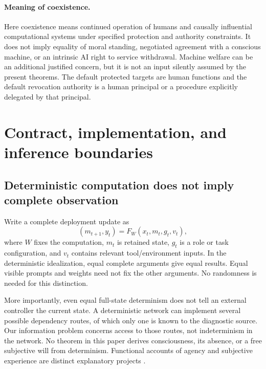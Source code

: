 \documentclass[11pt,a4paper]{article}
\theoremstyle{definition}\newtheorem{definition}{Definition}
\begin{document}
\paragraph{Meaning of coexistence.}
Here coexistence means continued operation of humans and causally influential computational systems under specified protection and authority constraints. It does not imply equality of moral standing, negotiated agreement with a conscious machine, or an intrinsic AI right to service withdrawal. Machine welfare can be an additional justified concern, but it is not an input silently assumed by the present theorems. The default protected targets are human functions and the default revocation authority is a human principal or a procedure explicitly delegated by that principal.

\section{Contract, implementation, and inference boundaries}
\label{sec:contract}
\subsection{Deterministic computation does not imply complete observation}
Write a complete deployment update as
\begin{equation}
(m_{t+1},y_t)=F_W(x_t,m_t,g_t,v_t),
\end{equation}
where $W$ fixes the computation, $m_t$ is retained state, $g_t$ is a role or task configuration, and $v_t$ contains relevant tool/environment inputs. In the deterministic idealization, equal complete arguments give equal results. Equal visible prompts and weights need not fix the other arguments. No randomness is needed for this distinction.

More importantly, even equal full-state determinism does not tell an external controller the current state. A deterministic network can implement several possible dependency routes, of which only one is known to the diagnostic source. Our information problem concerns access to those routes, not indeterminism in the network. No theorem in this paper derives consciousness, its absence, or a free subjective will from determinism. Functional accounts of agency and subjective experience are distinct explanatory projects \cite{kenton,uct}.

\end{document}
